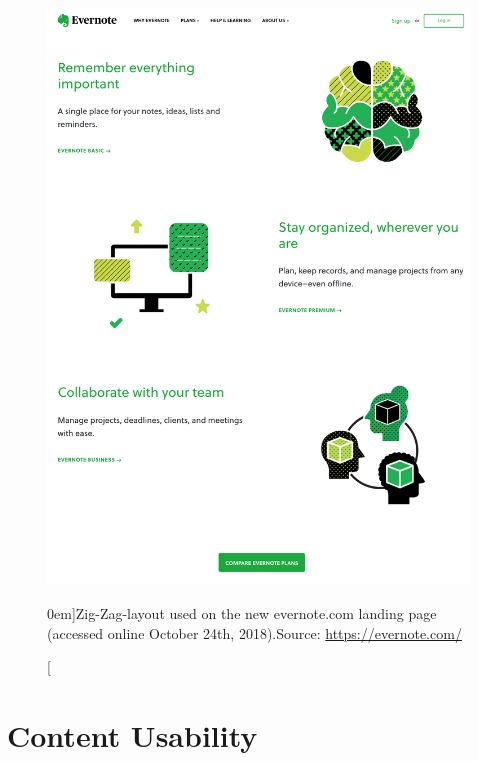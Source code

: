 \begin{figure}%
  \includegraphics[width=1.0\textwidth]{../figures/zig-zag-shape_evernote.png}
  \caption[][0em]{Zig-Zag-layout used on the new evernote.com landing page (accessed online October 24th, 2018).\newline Source: \url{https://evernote.com/}}
  \label{fig:zig-zag_evernote}
\end{figure}









\newpage
\section{Content Usability} %
\label{sec:content_usability}


